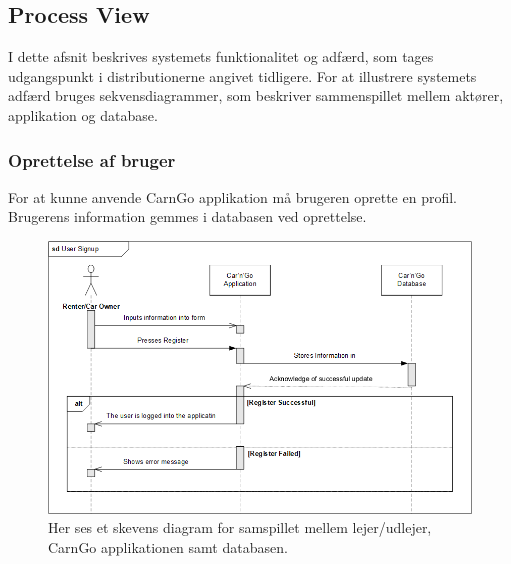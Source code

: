\documentclass[Arkitektur/System_main.tex]{subfiles}
\begin{document}
\subsection{Process View}
I dette afsnit beskrives systemets funktionalitet og adfærd, som tages udgangspunkt i distributionerne angivet tidligere. For at illustrere systemets adfærd bruges sekvensdiagrammer, som beskriver sammenspillet mellem aktører, applikation og database. 

\subsubsection{Oprettelse af bruger}
For at kunne anvende CarnGo applikation må brugeren oprette en profil. Brugerens information gemmes i databasen ved oprettelse. 
\begin{figure}[H]
    \centering
    \includegraphics[width=\textwidth]{Arkitektur/Softwarearkitektur/User_Signup/graphics/UserSignupSD.png}
    \caption{Her ses et skevens diagram for samspillet mellem lejer/udlejer, CarnGo applikationen samt databasen.}
    \label{fig:UserSignUpSD}
\end{figure}
\end{document}
